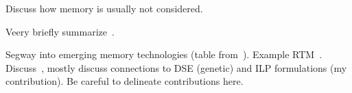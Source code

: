 Discuss how memory is usually not considered.

Veery briefly summarize~\cite{odendahl_date14,goens_jsa16,odendahl15}.

Segway into emerging memory technologies (table from~\cite{khan2019shiftsreduce}).
Example \ac{RTM}~\cite{rtm}.
Discuss~\cite{khan_date20}, mostly discuss connections to DSE (genetic) and ILP formulations (my contribution).
Be careful to delineate contributions here.
